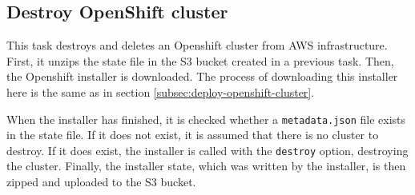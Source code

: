 \subsection{Destroy OpenShift cluster}\label{subsec:destroy-openshift-cluster}

This task destroys and deletes an Openshift cluster from AWS infrastructure.
First, it unzips the state file in the S3 bucket created in a previous task.
Then, the Openshift installer is downloaded.
The process of downloading this installer here is the same as in section \ref{subsec:deploy-openshift-cluster}.

When the installer has finished, it is checked whether a \verb|metadata.json| file exists in the state file.
If it does not exist, it is assumed that there is no cluster to destroy.
If it does exist, the installer is called with the \verb|destroy| option, destroying the cluster.
Finally, the installer state, which was written by the installer, is then zipped and uploaded to the S3 bucket.
